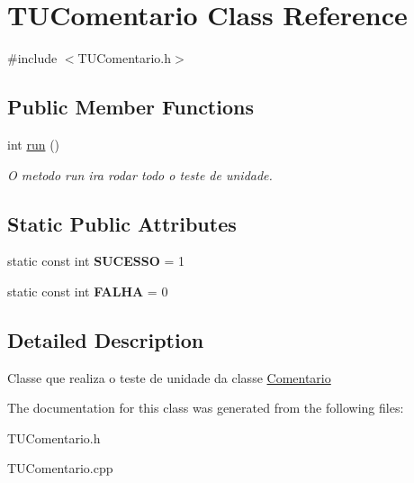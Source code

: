 \hypertarget{classTUComentario}{}\section{T\+U\+Comentario Class Reference}
\label{classTUComentario}


{\ttfamily \#include $<$T\+U\+Comentario.\+h$>$}

\subsection*{Public Member Functions}
\begin{DoxyCompactItemize}
\item 
int \hyperlink{classTUComentario_a61a380c75d7659387fc0cf88678345f2}{run} ()\hypertarget{classTUComentario_a61a380c75d7659387fc0cf88678345f2}{}\label{classTUComentario_a61a380c75d7659387fc0cf88678345f2}

\begin{DoxyCompactList}\small\item\em O metodo run ira rodar todo o teste de unidade. \end{DoxyCompactList}\end{DoxyCompactItemize}
\subsection*{Static Public Attributes}
\begin{DoxyCompactItemize}
\item 
static const int {\bfseries S\+U\+C\+E\+S\+SO} = 1\hypertarget{classTUComentario_a89e5bc93026c9a79debabb9040c08ba9}{}\label{classTUComentario_a89e5bc93026c9a79debabb9040c08ba9}

\item 
static const int {\bfseries F\+A\+L\+HA} = 0\hypertarget{classTUComentario_a56e5c01303d993c714328b7e45d04efd}{}\label{classTUComentario_a56e5c01303d993c714328b7e45d04efd}

\end{DoxyCompactItemize}


\subsection{Detailed Description}
Classe que realiza o teste de unidade da classe \hyperlink{classComentario}{Comentario} 

The documentation for this class was generated from the following files\+:\begin{DoxyCompactItemize}
\item 
T\+U\+Comentario.\+h\item 
T\+U\+Comentario.\+cpp\end{DoxyCompactItemize}

